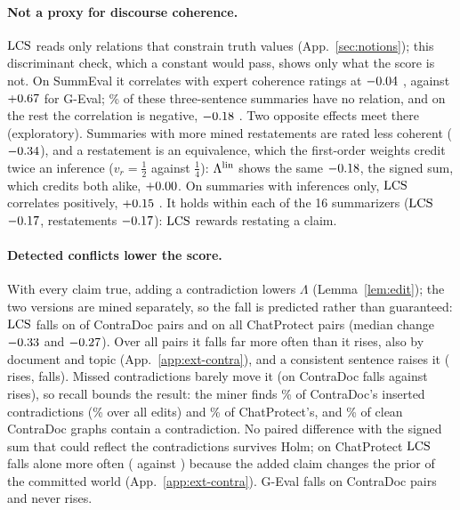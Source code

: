 \paragraph{Not a proxy for discourse coherence.} $\mathrm{LCS}$ reads only relations that constrain truth values (App.~\ref{sec:notions}); this discriminant
check, which a constant would pass, shows only what the score is not. On SummEval \citep{summeval} it correlates with expert
coherence ratings at $-0.04$ \asapCI{\extSeRhoCohGptLo}{\extSeRhoCohGptHi}, against
$+0.67$ for G-Eval; \extSeEmptyGpt\% of these three-sentence summaries have no relation,
and on the rest the correlation is negative, $-0.18$
\asapCI{\extSeNonEmptyRhoCohGptLo}{\extSeNonEmptyRhoCohGptHi}. Two opposite effects meet there (exploratory). Summaries with more mined restatements are rated less
coherent ($-0.34$), and a restatement is an equivalence, which the first-order
weights credit twice an inference ($v_r=\frac12$ against $\frac14$): $\Lambda^{\mathrm{lin}}$ shows the same
$-0.18$, the signed sum, which credits both alike, $+0.00$. On
summaries with inferences only, $\mathrm{LCS}$ correlates positively, $+0.15$
\asapCI{\extSeInfOnlyRhoCohGptLo}{\extSeInfOnlyRhoCohGptHi}. It holds within each of the 16 summarizers ($\mathrm{LCS}$ $-0.17$, restatements
$-0.17$): $\mathrm{LCS}$ rewards restating a claim.

\paragraph{Detected conflicts lower the score.} With every claim true, adding a contradiction lowers $\Lambda$ (Lemma~\ref{lem:edit}); the two versions
are mined separately, so the fall is predicted rather than guaranteed:
$\mathrm{LCS}$ falls on \extCdAssertEdgeDecGpt{} of \extCdAssertEdgeNGpt{} ContraDoc pairs
\citep{contradoc} and on all \extCpFoundFallGpt{} ChatProtect pairs \citep{mundler2024} (median
change $-0.33$ and $-0.27$). Over all pairs it falls far more often than it rises, also by document and topic (App.~\ref{app:ext-contra}), and a consistent sentence raises it (\extCpCtlIncGpt{} rises, \extCpCtlDecGpt{} falls). Missed
contradictions barely move it (on ContraDoc \extCdAssertNotFoundDecGpt{} falls against
\extCdAssertNotFoundIncGpt{} rises), so recall bounds the result: the miner finds
\extCdRecallInsertGpt\% of ContraDoc's inserted contradictions (\extCdRecallGpt\% over all edits) and
\extCpConfStrongGpt\% of ChatProtect's, and \extCdFpGpt\% of clean ContraDoc graphs contain a
contradiction. No paired difference with the signed sum that could reflect the contradictions survives Holm; on
ChatProtect $\mathrm{LCS}$ falls alone more often (\extCpMcAllOnlyLcsGpt{} against \extCpMcAllOnlySumGpt) because
the added claim changes the prior of the committed world (App.~\ref{app:ext-contra}). G-Eval falls on
\extCdJudgeDec{} ContraDoc pairs and never rises.

